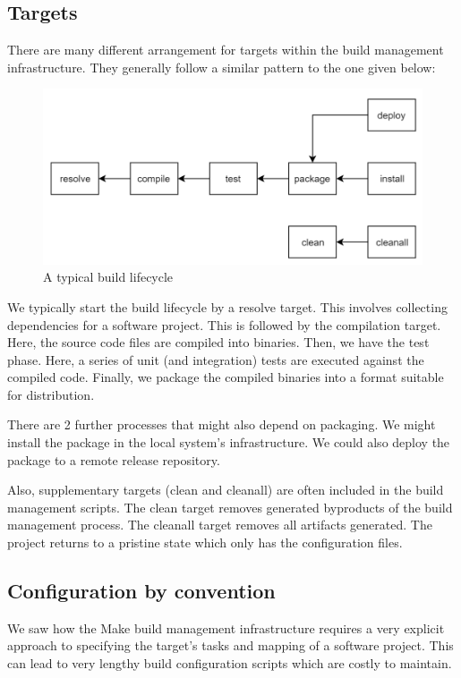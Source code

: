 \documentclass[a4paper, openany]{memoir}
\begin{document}
\subsection{Targets}
There are many different arrangement for targets within the build management infrastructure. They generally follow a similar pattern to the one given below:
\begin{figure}[H]
    \centering
    \includegraphics[scale=0.45]{src/8.2 Build Lifecycle.PNG}
    \caption{A typical build lifecycle}
\end{figure}
\noindent We typically start the build lifecycle by a resolve target. This involves collecting dependencies for a software project. This is followed by the compilation target. Here, the source code files are compiled into binaries. Then, we have the test phase. Here, a series of unit (and integration) tests are executed against the compiled code. Finally, we package the compiled binaries into a format suitable for distribution.

There are 2 further processes that might also depend on packaging. We might install the package in the local system's infrastructure. We could also deploy the package to a remote release repository.

Also, supplementary targets (clean and cleanall) are often included in the build management scripts. The clean target removes generated byproducts of the build management process. The cleanall target removes all artifacts generated. The project returns to a pristine state which only has the configuration files.

\subsection{Configuration by convention}
We saw how the Make build management infrastructure requires a very explicit approach to specifying the target's tasks and mapping of a software project. This can lead to very lengthy build configuration scripts which are costly to maintain. 
\end{document}
